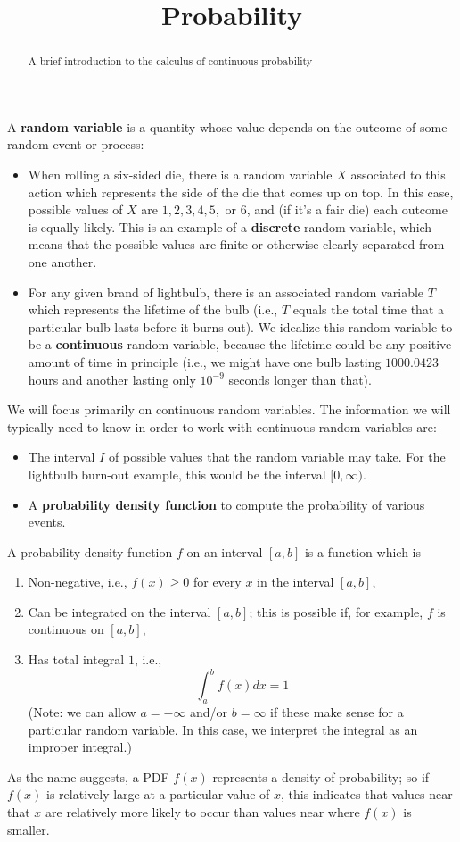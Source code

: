 \documentclass{ximera}
\title{Probability}
\begin{document}
\begin{abstract}
  A brief introduction to the calculus of continuous probability
\end{abstract}
\maketitle


A \textbf{random variable} is a quantity whose value depends on the outcome of some random event or process:
\begin{itemize}
\item When rolling a six-sided die, there is a random variable $X$ associated to this action which represents the side of the die that comes up on top. In this case, possible values of $X$ are $1,2,3,4,5,$ or $6$, and (if it's a fair die) each outcome is equally likely. This is an example of a \textbf{discrete} random variable, which means that the possible values are finite or otherwise clearly separated from one another.
\item For any given brand of lightbulb, there is an associated random variable $T$ which represents the lifetime of the bulb (i.e., $T$ equals the total time that a particular bulb lasts before it burns out). We idealize this random variable to be a \textbf{continuous} random variable, because the lifetime could be any positive amount of time in principle (i.e., we might have one bulb lasting $1000.0423$ hours and another lasting only $10^{-9}$ seconds longer than that).
\end{itemize}

We will focus primarily on continuous random variables. The information we will typically need to know in order to work with continuous random variables are:
\begin{itemize}
\item The interval $I$ of possible values that the random variable may take. For the lightbulb burn-out example, this would be the interval $[0,\infty)$.
\item A \textbf{probability density function} to compute the probability of various events.
\end{itemize}
\begin{definition}
A probability density function $f$ on an interval $[a,b]$ is a function which is
\begin{enumerate}
\item Non-negative, i.e., $f(x) \geq 0$ for every $x$ in the interval $[a,b]$,
\item Can be integrated on the interval $[a,b]$; this is possible if, for example, $f$ is continuous on $[a,b]$,
\item Has total integral $1$, i.e.,
\[ \int_a^b f(x) dx = 1 \]
(Note: we can allow $a = -\infty$ and/or $b = \infty$ if these make sense for a particular random variable. In this case, we interpret the integral as an improper integral.)
\end{enumerate}
\end{definition}
As the name suggests, a PDF $f(x)$ represents a density of probability; so if $f(x)$ is relatively large at a particular value of $x$, this indicates that values near that $x$ are relatively more likely to occur than values near where $f(x)$ is smaller.
\end{document}
